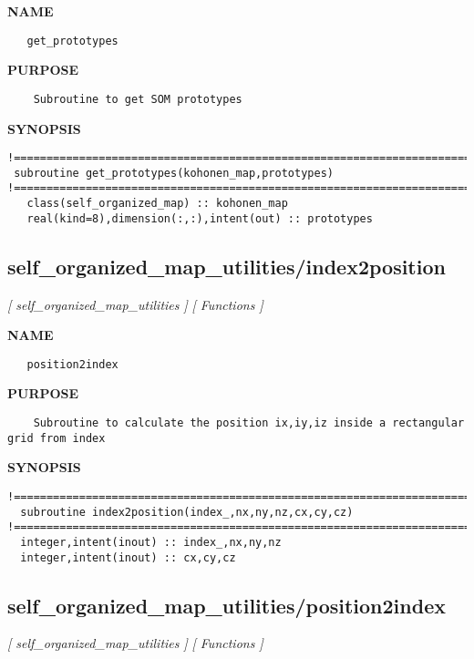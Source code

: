 \documentclass{article}
\begin{document}
\label{ch:robo47}
\label{ch:self_organized_map_utilities_get_prototypes}
\textbf{NAME}
\begin{verbatim}
   get_prototypes
\end{verbatim}
\textbf{PURPOSE}
\begin{verbatim}
    Subroutine to get SOM prototypes
\end{verbatim}
\textbf{SYNOPSIS}
\begin{verbatim}
!========================================================================================
 subroutine get_prototypes(kohonen_map,prototypes)
!========================================================================================
   class(self_organized_map) :: kohonen_map
   real(kind=8),dimension(:,:),intent(out) :: prototypes
\end{verbatim}
\newpage
\subsection{self\_organized\_map\_utilities/index2position}
\textsl{[ self\_organized\_map\_utilities ]}
\textsl{[ Functions ]}

\label{ch:robo48}
\label{ch:self_organized_map_utilities_index2position}
\textbf{NAME}
\begin{verbatim}
   position2index
\end{verbatim}
\textbf{PURPOSE}
\begin{verbatim}
    Subroutine to calculate the position ix,iy,iz inside a rectangular grid from index
\end{verbatim}
\textbf{SYNOPSIS}
\begin{verbatim}
!========================================================================================
  subroutine index2position(index_,nx,ny,nz,cx,cy,cz)
!========================================================================================
  integer,intent(inout) :: index_,nx,ny,nz
  integer,intent(inout) :: cx,cy,cz
\end{verbatim}
\newpage
\subsection{self\_organized\_map\_utilities/position2index}
\textsl{[ self\_organized\_map\_utilities ]}
\textsl{[ Functions ]}
\end{document}
